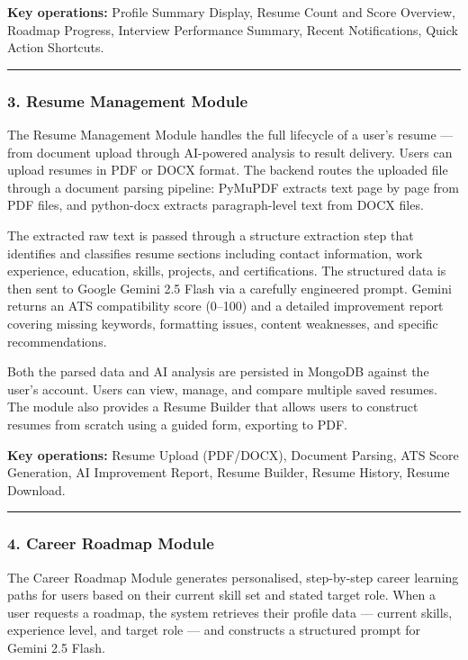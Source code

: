 \documentclass[12pt]{article}
\begin{document}
\textbf{Key operations:} Profile Summary Display, Resume Count and Score Overview, Roadmap Progress, Interview Performance Summary, Recent Notifications, Quick Action Shortcuts.

\noindent\rule{\textwidth}{0.4pt}

\subsubsection{3. Resume Management Module}

The Resume Management Module handles the full lifecycle of a user's resume — from document upload through AI-powered analysis to result delivery. Users can upload resumes in PDF or DOCX format. The backend routes the uploaded file through a document parsing pipeline: PyMuPDF extracts text page by page from PDF files, and python-docx extracts paragraph-level text from DOCX files.

The extracted raw text is passed through a structure extraction step that identifies and classifies resume sections including contact information, work experience, education, skills, projects, and certifications. The structured data is then sent to Google Gemini 2.5 Flash via a carefully engineered prompt. Gemini returns an ATS compatibility score (0–100) and a detailed improvement report covering missing keywords, formatting issues, content weaknesses, and specific recommendations.

Both the parsed data and AI analysis are persisted in MongoDB against the user's account. Users can view, manage, and compare multiple saved resumes. The module also provides a Resume Builder that allows users to construct resumes from scratch using a guided form, exporting to PDF.

\textbf{Key operations:} Resume Upload (PDF/DOCX), Document Parsing, ATS Score Generation, AI Improvement Report, Resume Builder, Resume History, Resume Download.

\noindent\rule{\textwidth}{0.4pt}

\subsubsection{4. Career Roadmap Module}

The Career Roadmap Module generates personalised, step-by-step career learning paths for users based on their current skill set and stated target role. When a user requests a roadmap, the system retrieves their profile data — current skills, experience level, and target role — and constructs a structured prompt for Gemini 2.5 Flash.
\end{document}
